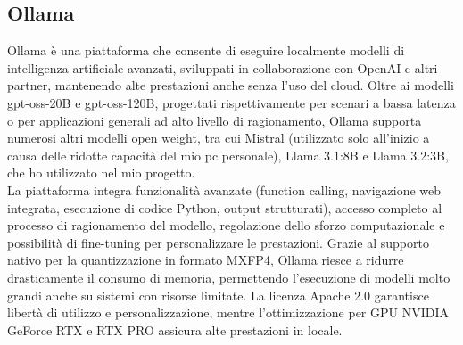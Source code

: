 \subsection{Ollama}
\noindent Ollama è una piattaforma che consente di eseguire localmente modelli di intelligenza artificiale avanzati, sviluppati in collaborazione con OpenAI e altri partner, mantenendo alte prestazioni anche senza l’uso del cloud. 
Oltre ai modelli gpt-oss-20B e gpt-oss-120B, progettati rispettivamente per scenari a bassa latenza o per applicazioni generali ad alto livello di ragionamento, Ollama supporta numerosi altri modelli open weight, tra cui Mistral (utilizzato solo all’inizio a causa delle ridotte capacità del mio pc personale), Llama 3.1:8B e Llama 3.2:3B, che ho utilizzato nel mio progetto.\\ 
La piattaforma integra funzionalità avanzate (function calling, navigazione web integrata, esecuzione di codice Python, output strutturati), accesso completo al processo di ragionamento del modello, regolazione dello sforzo computazionale e possibilità di fine-tuning per personalizzare le prestazioni. 
Grazie al supporto nativo per la quantizzazione in formato MXFP4, Ollama riesce a ridurre drasticamente il consumo di memoria, permettendo l’esecuzione di modelli molto grandi anche su sistemi con risorse limitate. 
La licenza Apache 2.0 garantisce libertà di utilizzo e personalizzazione, mentre l’ottimizzazione per GPU NVIDIA GeForce RTX e RTX PRO assicura alte prestazioni in locale.

\newpage
